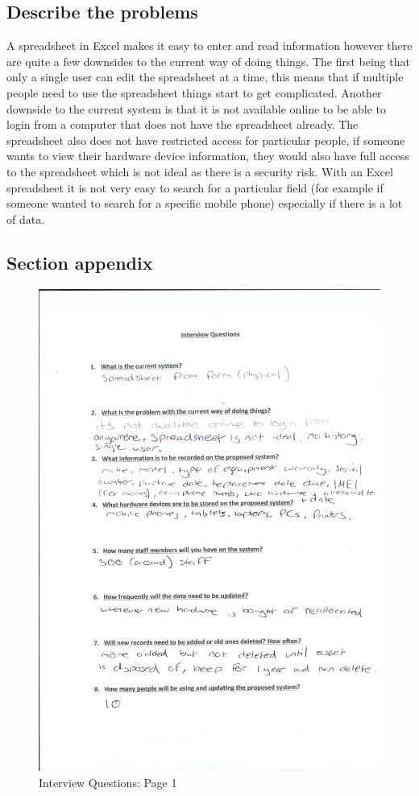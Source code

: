 \subsection{Describe the problems}

A spreadsheet in Excel makes it easy to enter and read information however there are quite a few downsides to the current way of doing things. The first being that only a single user can edit the spreadsheet at a time, this means that if multiple people need to use the spreadsheet things start to get complicated. Another downside to the current system is that it is not available online to be able to login from a computer that does not have the spreadsheet already. The spreadsheet also does not have restricted access for particular people, if someone wants to view their hardware device information, they would also have full access to the spreadsheet which is not ideal as there is a security risk. With an Excel spreadsheet it is not very easy to search for a particular field (for example if someone wanted to search for a specific mobile phone) especially if there is a lot of data.

\subsection{Section appendix}

\begin{figure}[H]
\includegraphics[width=.9\textwidth,height=.9\textheight,keepaspectratio]{Page1Interview.jpg}
\caption{Interview Questions: Page 1} \label{Page1Interview}
\end{figure}

